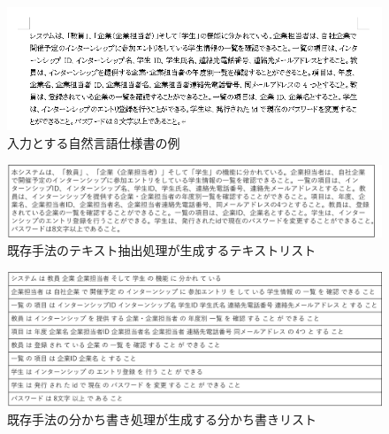 \begin{figure}[tp]
    \begin{center}
        \includegraphics[width=1.0\columnwidth]{image/exis_spec_example.png}
        \caption{入力とする自然言語仕様書の例}
        \label{fig:exis_spec_example}
    \end{center}
\end{figure}

\begin{figure}[tp]
    \begin{center}
        \includegraphics[width=1.0\columnwidth]{image/exis_text_list.png}
        \caption{既存手法のテキスト抽出処理が生成するテキストリスト}
        \label{fig:exis_test_list}
    \end{center}
\end{figure}

\begin{figure}[tp]
    \begin{center}
        \includegraphics[width=1.0\columnwidth]{image/exis_wakati_list.png}
        \caption{既存手法の分かち書き処理が生成する分かち書きリスト}
        \label{fig:exis_wakati_list}
    \end{center}
\end{figure}

